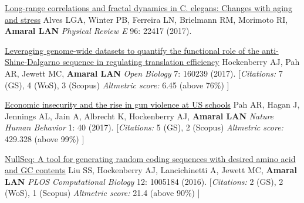\NumberedItem{\makebox[0.8cm][r]{[122]}}
\href{/people/amaral/long-range-correlations-and-fractal-dynamics-c-elegans-changes-aging-and-stress/}
{Long-range correlations and fractal dynamics in C. elegans: Changes with aging and stress}
\newline
Alves LGA, Winter PB, Ferreira LN, Brielmann RM, Morimoto RI, {\textbf{Amaral LAN}}
\newline
\textit{Physical Review E}
    96:
22417 (2017).
\newline
\Gap
~
\Gap

\NumberedItem{\makebox[0.8cm][r]{[121]}}
\href{/people/amaral/leveraging-genome-wide-datasets-quantify-functional-role-anti-shinedalgarno-sequence-regulating-translation-efficiency}
{Leveraging genome-wide datasets to quantify the functional role of the anti-Shine-Dalgarno sequence in regulating translation efficiency}
\newline
Hockenberry AJ, Pah AR, Jewett MC, {\textbf{Amaral LAN}}
\newline
\textit{Open Biology}
    7:
160239 (2017).
    \newline
    \hfill [{\em{Citations:}} 7 (GS),
    4 (WoS), 3 (Scopus)
        {\hspace*{1cm} \em{Altmetric score:}}  6.45 (above 76\%)
    ]
\newline
\Gap
~
\Gap

\NumberedItem{\makebox[0.8cm][r]{[120]}}
\href{/people/amaral/economic-insecurity-and-rise-gun-violence-us-schools}
{Economic insecurity and the rise in gun violence at US schools}
\newline
Pah AR, Hagan J, Jennings AL, Jain A, Albrecht K, Hockenberry AJ, {\textbf{Amaral LAN}}
\newline
\textit{Nature Human Behavior}
    1:
40 (2017).
    \newline
    \hfill [{\em{Citations:}} 5 (GS), 2 (Scopus)
        {\hspace*{1cm} \em{Altmetric score:}}  429.328 (above 99\%)
    ]
\newline
\Gap
~
\Gap

\NumberedItem{\makebox[0.8cm][r]{[119]}}
\href{/people/amaral/nullseq-tool-generating-random-coding-sequences-desired-amino-acid-and-gc-contents}
{NullSeq: A tool for generating random coding sequences with desired amino acid and GC contents}
\newline
Liu SS, Hockenberry AJ, Lancichinetti A, Jewett MC, {\textbf{Amaral LAN}}
\newline
\textit{PLOS Computational Biology}
    12:
1005184 (2016).
    \newline
    \hfill [{\em{Citations:}} 2 (GS),
    2 (WoS), 1 (Scopus)
        {\hspace*{1cm} \em{Altmetric score:}}  21.4 (above 90\%)
    ]
\newline
\Gap
~
\Gap

